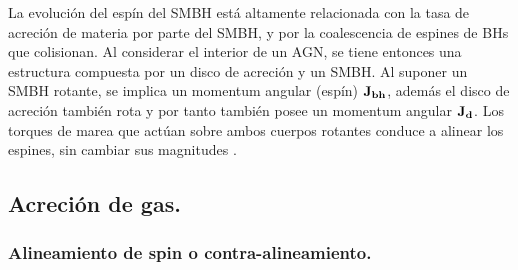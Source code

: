 La evolución del espín del SMBH está altamente relacionada con la tasa de acreción de materia por parte del SMBH\cite{king2005}, y por la coalescencia de espines de BHs que colisionan\cite{dubois2014}. Al considerar el interior de un AGN, se tiene entonces una estructura compuesta por un disco de acreción y un SMBH. Al suponer un SMBH rotante, se implica un momentum angular (espín) $\bf{J}_{bh}$, además el disco de acreción también rota y por tanto también posee un momentum angular $\bf{J}_{d}$. Los torques de marea que actúan sobre ambos cuerpos rotantes conduce a alinear los espines, sin cambiar sus magnitudes \cite{king2005}.



\subsection{Acreción de gas.}
\label{subsec: Acrecion_gas}


\subsubsection{Alineamiento de spin o contra-alineamiento.}
\label{subsubsec: Aling_Spin}











